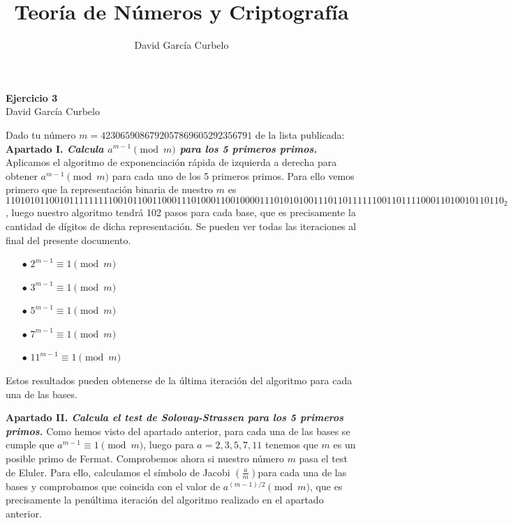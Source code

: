 \documentclass[fleqn]{article}
\author{David García Curbelo}
\title{Teoría de Números y Criptografía}
\begin{document}
    \begin{center}
        \LARGE{\textbf{Ejercicio 3}} \\
        \Large{David García Curbelo} \\
    \end{center}

    \vspace{1cm}
    
    Dado tu número $m = 4230659086792057869605292356791$  de la lista publicada: \\ 


    \textbf{Apartado I. \textit{Calcula $ a^{m-1} \pmod{m}$ para los 5 primeros primos.}} 
    Aplicamos el algoritmo de exponenciación rápida de izquierda a derecha para obtener $a^{m-1} \pmod{m}$ para cada 
    uno de los 5 primeros primos. Para ello vemos primero que la representación binaria de nuestro $m$ es 
    $110101011001011111111100101100110001110100011001000011101010100111011011111100110111100011010010110110_2$, luego 
    nuestro algoritmo tendrá 102 pasos para cada base, que es precisamente la cantidad de dígitos de dicha representación.
    Se pueden ver todas las iteraciones al final del presente documento.\\
    \begin{enumerate}
        \item[$\bullet$] $ 2^{m-1} \equiv 1 \pmod{m}$
        \item[$\bullet$] $ 3^{m-1} \equiv 1 \pmod{m}$
        \item[$\bullet$] $ 5^{m-1} \equiv 1 \pmod{m}$
        \item[$\bullet$] $ 7^{m-1} \equiv 1 \pmod{m}$
        \item[$\bullet$] $ 11^{m-1} \equiv 1 \pmod{m}$
    \end{enumerate}
    Estos resultados pueden obtenerse de la última iteración del algoritmo para cada una de las bases.


    \newpage
    \textbf{Apartado II. \textit{Calcula el test de Solovay-Strassen para los 5 primeros primos.}}
    Como hemos visto del apartado anterior, para cada una de las bases se cumple que $a^{m-1} \equiv 1 \pmod{m}$, luego para
    $a = 2,3,5,7,11$ tenemos que $m$ es un posible primo de Fermat. Comprobemos ahora si nuestro número $m$ pasa el test de
    Eluler. Para ello, calculamos el símbolo de Jacobi $\left(\frac{a}{m}\right)$para cada una de las bases y comprobamos que coincida con el valor de
    $a^{(m-1)/2} \pmod{m}$, que es precisamente la penúltima iteración del algoritmo realizado en el apartado anterior.\\
\end{document}
